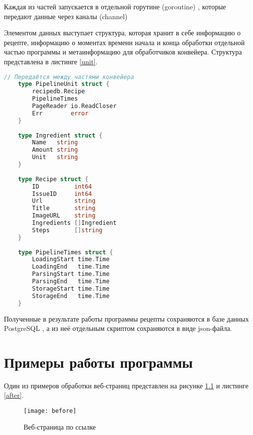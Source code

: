 Каждая из частей запускается в отдельной горутине (goroutine) \cite{go-mem}, которые передают данные через каналы (channel) \cite{go-mem}

Элементом данных выступает структура, которая хранит в себе информацию о рецепте, информацию о моментах времени начала и конца обработки отдельной частью программы и метаинформацию для обработчиков конвейера. Структура представлена в листинге \ref{unit}.

\begin{lstlisting}[label=unit,caption={Данные, передающиеся между частями конвейера},language=go]
	// Передаётся между частями конвейера
	type PipelineUnit struct {
		recipedb.Recipe
		PipelineTimes
		PageReader io.ReadCloser
		Err        error
	}
	
	type Ingredient struct {
		Name   string
		Amount string
		Unit   string
	}
	
	type Recipe struct {
		ID          int64
		IssueID     int64
		Url         string
		Title       string
		ImageURL    string
		Ingredients []Ingredient
		Steps       []string
	}
	
	type PipelineTimes struct {
		LoadingStart time.Time
		LoadingEnd   time.Time
		ParsingStart time.Time
		ParsingEnd   time.Time
		StorageStart time.Time
		StorageEnd   time.Time
	}
\end{lstlisting}

Полученные в результате работы программы рецепты сохраняются в базе данных PostgreSQL \cite{pgs}, а из неё отдельным скриптом сохраняются в виде json-файла.

\vspace{20mm}
{\let\clearpage\relax \chapter{Примеры работы программы}}

Один из примеров обработки веб-страниц \cite{receipt} представлен на рисунке \ref{before} и листинге \ref{after}.

\begin{figure}[h]
	\centering
	\texttt{[image: before]}
	\caption{Веб-страница по ссылке \cite{receipt}}
	\label{before}
\end{figure}

